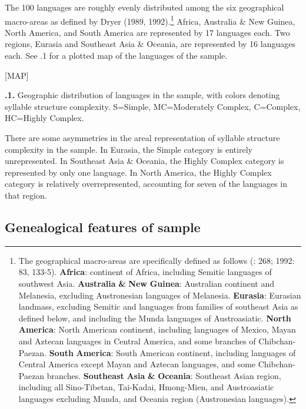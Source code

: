   The 100 languages are roughly evenly distributed among the six geographical macro-areas as defined by Dryer (1989, 1992).\footnote{ \textrm{The geographical macro-areas are specifically defined as follows (\citealt{Dryer1989}: 268; 1992: 83, 133-5).} \textrm{\textbf{Africa}}\textrm{: continent of Africa, including Semitic languages of southwest Asia.} \textrm{\textbf{Australia} \textbf{\&} \textbf{New} \textbf{Guinea}}\textrm{: Australian continent and Melanesia, excluding Austronesian languages of Melanesia.} \textrm{\textbf{Eurasia}}\textrm{: Eurasian landmass, excluding Semitic and languages from families of southeast Asia as defined below, and including the Munda languages of Austroasiatic.} \textrm{\textbf{North} \textbf{America}}\textrm{: North American continent, including languages of Mexico, Mayan and Aztecan languages in Central America, and some branches of Chibchan-Paezan.} \textrm{\textbf{South} \textbf{America}}\textrm{: South American continent, including languages of Central America except Mayan and Aztecan languages, and some Chibchan-Paezan branches.} \textrm{\textbf{Southeast} \textbf{Asia} \textbf{\&} \textbf{Oceania}}\textrm{: Southeast Asian region, including all Sino-Tibetan, Tai-Kadai, Hmong-Mien, and Austroasiatic languages excluding Munda, and Oceania region (Austronesian languages).}} Africa, Australia \& New Guinea, North America, and South America are represented by 17 languages each. Two regions, Eurasia and Southeast Asia \& Oceania, are represented by 16 languages each. See .1 for a plotted map of the languages of the sample.

[MAP]

\textbf{.1.} Geographic distribution of languages in the sample, with colors denoting syllable structure complexity. S=Simple, MC=Moderately Complex, C=Complex, HC=Highly Complex.

  There are some asymmetries in the areal representation of syllable structure complexity in the sample. In Eurasia, the Simple category is entirely unrepresented. In Southeast Asia \& Oceania, the Highly Complex category is represented by only one language. In North America, the Highly Complex category is relatively overrepresented, accounting for seven of the languages in that region.

\subsection{Genealogical features of sample}\label{sec:2.4.2}

